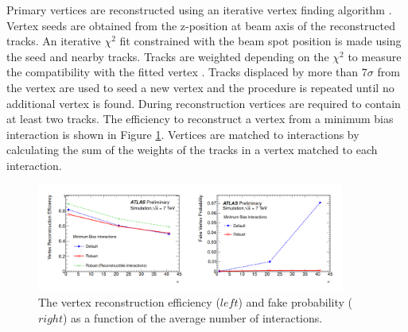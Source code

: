 Primary vertices are reconstructed using an iterative vertex finding algorithm \cite{Vrtx_Eff}. Vertex seeds are obtained from the z-position at beam axis of the reconstructed tracks. An iterative $\chi^2$ fit constrained with the beam spot position is made using the seed and nearby tracks. Tracks are weighted depending on the $\chi^2$ to measure the compatibility with the fitted vertex \cite{chi2}. Tracks displaced by more than 7$\sigma$ from the vertex are used to seed a new vertex and the procedure is repeated until no additional vertex is found. During reconstruction vertices are required to contain at least two tracks. The efficiency to reconstruct a vertex from a minimum bias interaction is shown in Figure \ref{fig:chap2:Objects:Vtx:Eff}. Vertices  are matched to interactions by calculating the sum of the weights of the tracks in a vertex matched to each interaction. 
\begin{figure}[htbp]
    \centering
    \includegraphics[width=0.9\textwidth]{Ch2/Img/Vtx_Reco_Eff.png}
    \caption{The vertex reconstruction efficiency ($left$) and fake probability ($right$) as a function of the average number of interactions.}
    \label{fig:chap2:Objects:Vtx:Eff}
\end{figure}

